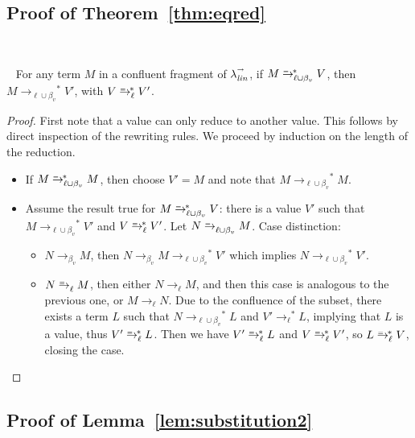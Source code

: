 \documentclass{LMCS}
\makeatletter
\newcommand{\recap}[2]{\medskip\noindent{\bf #1 \ref{#2}.}~}
\newcommand{\xllin}[1]{\ensuremath{\lambda^{\raisebox{0.5ex}{\textrm{\tiny $#1$}}}_{{\it lin}}}}
\newcommand{\llinred}{\xllin{\rightarrow}}
\newcommand{\xto}[1]{\ensuremath{\rightarrow_{#1}}}
\newcommand{\simxto}[1]{\ensuremath{\rightarrow_{#1}^{\hspace{-2.2ex}\textrm{\tiny=}}}}
\newcommand{\ssimxto}[1]{\ensuremath{\rightarrow_{#1}^{\hspace{-2.2ex}\textrm{\tiny=}\ *}}}
\newcommand{\tolinred}{\xto{\ell}}
\newcommand{\tolineq}{\simxto{\ell}}
\newcommand{\stolinred}{\ensuremath{\xto{\ell}^{\ast}}}
\newcommand{\tobv}{\xto{\beta_v}}
\newcommand{\toblineq}{\simxto{{\ell}\cup\beta_v}}
\newcommand{\stoblinred}{\ensuremath{\xto{\ell\cup\beta_v}^{\ast}}}
\newcommand{\stoblineq}{\ensuremath{\ssimxto{{\ell}\cup\beta_v}}}
\newcommand{\stolineq}{\ensuremath{\ssimxto{{\ell}}}}
\def\mynobreakpar{\par\nobreak\@afterheading}
\makeatother
\begin{document}
\subsection{Proof of Theorem~\ref{thm:eqred}}\label{proof:eqred}~
\mynobreakpar
\recap{Theorem}{thm:eqred}
For any term $M$ in a confluent fragment of $\llinred$, if $M\stoblineq V$, then $M\stoblinred V'$, with $V\stolineq V'$.
\begin{proof}
  First note that a value can only reduce to another value. This
  follows by direct inspection of the rewriting rules.
We proceed by induction on the length of the reduction.
  \begin{itemize}
    \item If $M \stoblineq M$, then choose $V'=M$ and note that
      $M\stoblinred M$.
    \item Assume the result true for $M \stoblineq V$: there is a value
      $V'$ such that $M\stoblinred V'$ and $V\stolineq V'$. Let
      $N\toblineq M$. Case distinction:
      \begin{itemize}
	\item $N\tobv M$, then $N\tobv M\stoblinred V'$ which implies
	  $N\stoblinred V'$.
	\item $N\tolineq M$, then either $N\tolinred M$, and then this
	  case is analogous to the previous one, or $M\tolinred N$. Due to
	  the confluence of the subset, there exists a term $L$ such that
	  $N\stoblinred L$ and $V'\stolinred L$, implying that $L$ is a
	  value, thus $V'\stolineq L$. Then we have $V'\stolineq L$ and
	  $V\stolineq V'$, so $L\stolineq V$, closing the case.\qedhere
      \end{itemize}
  \end{itemize}
\end{proof}


\subsection{Proof of Lemma~\ref{lem:substitution2}}\label{proof:substitution2}~
\end{document}
